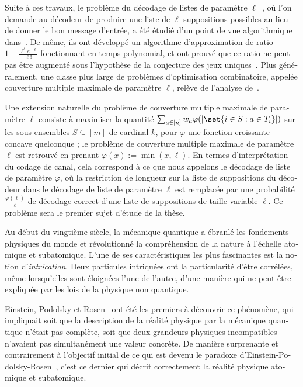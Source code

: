 \begin{otherlanguage}{french}
Suite à ces travaux, le problème du décodage de listes de paramètre $\ell$~\cite{Elias57,Wozencraft58}, où l'on demande au décodeur de produire une liste de $\ell$ suppositions possibles au lieu de donner le bon message d'entrée, a été étudié d'un point de vue algorithmique dans~\cite{BFGG20}. De même, ils ont développé un algorithme d'approximation de ratio $1-\frac{\ell^{\ell}e^{-\ell}}{\ell!}$ fonctionnant en temps polynomial, et ont prouvé que ce ratio ne peut pas être augmenté sous l'hypothèse de la conjecture des jeux uniques~\cite{Khot02}. Plus généralement, une classe plus large de problèmes d'optimisation combinatoire, appelée couverture multiple maximale de paramètre $\ell$, relève de l'analyse de~\cite{BFGG20}.

Une extension naturelle du problème de couverture multiple maximale de paramètre $\ell$ consiste à maximiser la quantité $\sum_{a \in [n]} w_a\varphi(\abs{\set{i \in S : a \in T_i}})$ sur les sous-ensembles $S \subseteq [m]$ de cardinal $k$, pour $\varphi$ une fonction croissante concave quelconque ; le problème de couverture multiple maximale de paramètre $\ell$ est retrouvé en prenant $\varphi(x) := \min(x,\ell)$. En termes d'interprétation du codage de canal, cela correspond à ce que nous appelons le décodage de liste de paramètre $\varphi$, où la restriction de longueur sur la liste de suppositions du décodeur dans le décodage de liste de paramètre $\ell$ est remplacée par une probabilité $\frac{\varphi(\ell)}{\ell}$ de décodage correct d'une liste de suppositions de taille variable $\ell$. Ce problème sera le premier sujet d'étude de la thèse.

Au début du vingtième siècle, la mécanique quantique a ébranlé les fondements physiques du monde et révolutionné la compréhension de la nature à l'échelle atomique et subatomique. L'une de ses caractéristiques les plus fascinantes est la notion d'\emph{intrication}. Deux particules intriquées ont la particularité d'être corrélées, même lorsqu'elles sont éloignées l'une de l'autre, d'une manière qui ne peut être expliquée par les lois de la physique non quantique.

Einstein, Podolsky et Rosen~\cite{EPR35} ont été les premiers à découvrir ce phénomène, qui impliquait soit que la description de la réalité physique par la mécanique quantique n'était pas complète, soit que deux grandeurs physiques incompatibles n'avaient pas simultanément une valeur concrète. De manière surprenante et contrairement à l'objectif initial de ce qui est devenu le paradoxe d'Einstein-Podolsky-Rosen~\cite{EPR35}, c'est ce dernier qui décrit correctement la réalité physique atomique et subatomique.


\end{otherlanguage}
